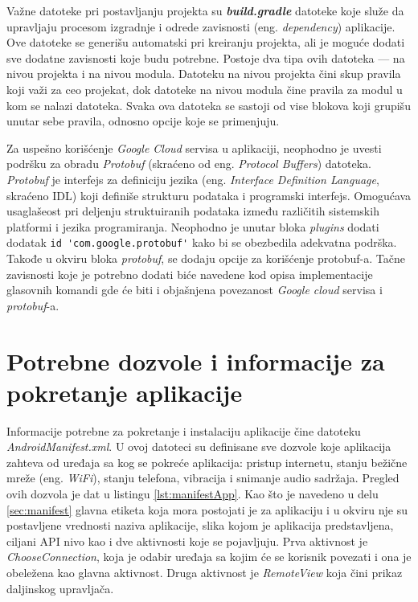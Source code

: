 \documentclass[implementacija.tex]{subfiles}
\begin{document}
Važne datoteke pri postavljanju projekta su \textbf{\textit{build.gradle}} datoteke koje služe da  upravljaju procesom izgradnje i odrede zavisnosti (eng. \textit{dependency}) aplikacije. Ove datoteke se generišu automatski pri kreiranju projekta, ali je moguće dodati sve dodatne zavisnosti koje budu potrebne. Postoje dva tipa ovih datoteka --- na nivou projekta i na nivou modula. Datoteku na nivou projekta čini skup pravila koji važi za ceo projekat, dok datoteke na nivou modula čine pravila za modul u kom se nalazi datoteka. Svaka ova datoteka se sastoji od vise blokova koji grupišu unutar sebe pravila, odnosno opcije koje se primenjuju.

Za uspešno korišćenje \textit{Google Cloud} servisa u aplikaciji, neophodno je uvesti podršku za obradu \textit{Protobuf} (skraćeno od eng. \textit{Protocol Buffers}) datoteka. \textit{Protobuf} je interfejs za definiciju jezika (eng. \textit{Interface Definition Language}, skraćeno IDL) koji definiše strukturu podataka i programski interfejs. \cite{sajt:protobuf} Omogućava usaglašeost pri deljenju struktuiranih podataka između različitih sistemskih platformi i jezika programiranja. Neophodno je unutar bloka \textit{plugins} dodati dodatak \verb|id 'com.google.protobuf'| kako bi se obezbedila adekvatna podrška. Takođe u okviru bloka \textit{protobuf}, se dodaju opcije za korišćenje protobuf-a. Tačne zavisnosti koje je potrebno dodati biće navedene kod opisa implementacije glasovnih komandi gde će biti i objašnjena povezanost \textit{Google cloud} servisa i \textit{protobuf}-a.

\section{Potrebne dozvole i informacije za pokretanje aplikacije}

Informacije potrebne za pokretanje i instalaciju aplikacije čine datoteku \textit{AndroidManifest.xml}. U ovoj datoteci su definisane sve dozvole koje aplikacija zahteva od uređaja sa kog se pokreće aplikacija: pristup internetu, stanju bežične mreže (eng. \textit{WiFi}), stanju telefona, vibracija i  snimanje audio sadržaja. Pregled ovih dozvola je dat u listingu \ref{lst:manifestApp}. Kao što je navedeno u delu \ref{sec:manifest} glavna etiketa koja mora postojati je za aplikaciju i u okviru nje su postavljene vrednosti naziva aplikacije, slika kojom je aplikacija predstavljena, ciljani API nivo kao i dve aktivnosti koje se pojavljuju. Prva aktivnost je \textit{ChooseConnection}, koja je odabir uređaja sa kojim će se korisnik povezati i ona je obeležena kao glavna aktivnost. Druga aktivnost je \textit{RemoteView} koja čini prikaz daljinskog upravljača. 
\end{document}
